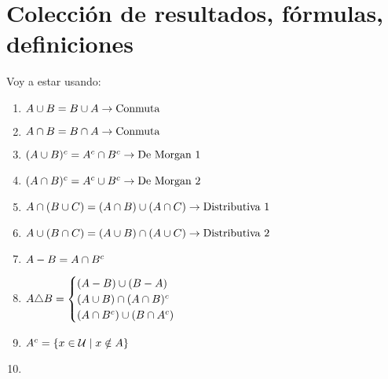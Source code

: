 \section*{Colección de resultados, fórmulas, definiciones}
Voy a estar usando:
\begin{enumerate}[label=(\alph*)]
	\item $A \cup B = B \cup A \to \text{Conmuta}$
	\item $A \cap B = B \cap A \to \text{Conmuta}$
	\item $(A \cup B)^c = A^c \cap B^c \to \text{De Morgan 1}$
	\item $(A \cap B)^c = A^c \cup B^c \to \text{De Morgan 2}$
	\item $A \cap(B \cup C) = (A \cap B) \cup (A \cap C) \to \text{Distributiva 1}$
	\item $A \cup(B \cap C) = (A \cup B) \cap (A \cup C) \to \text{Distributiva 2}$
	\item $A - B = A \cap B^c$
	\item $A \triangle B =
		      \begin{cases}
			      (A - B) \cup (B - A)             \\
			      (A \cup B) \cap (A \cap B)^c \\
			      (A \cap B^c) \cup (B \cap A^c)
		      \end{cases}
	      $
	\item $A^c = \left\{ x \in \mathcal U \;|\; x \notin A \right\}$
	\item
	      \def\subconjuntoYequivalente{
	      \begin{array}{|c|}
			      A \subseteq B \\
			      \hline
			      A^c \union B
		      \end{array}
            }


\end{enumerate}

